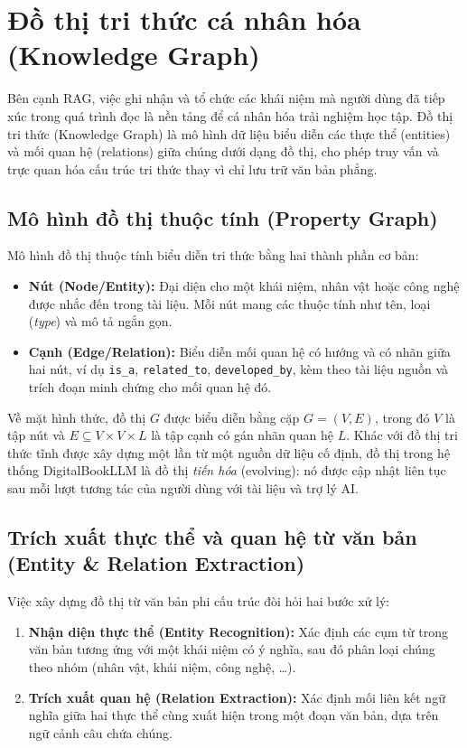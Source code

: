 \section{Đồ thị tri thức cá nhân hóa (Knowledge Graph)}

Bên cạnh RAG, việc ghi nhận và tổ chức các khái niệm mà người dùng đã tiếp xúc trong quá trình đọc là nền tảng để cá nhân hóa trải nghiệm học tập. Đồ thị tri thức (Knowledge Graph) là mô hình dữ liệu biểu diễn các thực thể (entities) và mối quan hệ (relations) giữa chúng dưới dạng đồ thị, cho phép truy vấn và trực quan hóa cấu trúc tri thức thay vì chỉ lưu trữ văn bản phẳng. \cite{lewis2020retrieval}

\subsection{Mô hình đồ thị thuộc tính (Property Graph)}
Mô hình đồ thị thuộc tính biểu diễn tri thức bằng hai thành phần cơ bản:

\begin{itemize}
    \item \textbf{Nút (Node/Entity):} Đại diện cho một khái niệm, nhân vật hoặc công nghệ được nhắc đến trong tài liệu. Mỗi nút mang các thuộc tính như tên, loại (\textit{type}) và mô tả ngắn gọn.
    \item \textbf{Cạnh (Edge/Relation):} Biểu diễn mối quan hệ có hướng và có nhãn giữa hai nút, ví dụ \texttt{is\_a}, \texttt{related\_to}, \texttt{developed\_by}, kèm theo tài liệu nguồn và trích đoạn minh chứng cho mối quan hệ đó.
\end{itemize}

Về mặt hình thức, đồ thị $G$ được biểu diễn bằng cặp $G = (V, E)$, trong đó $V$ là tập nút và $E \subseteq V \times V \times L$ là tập cạnh có gán nhãn quan hệ $L$. Khác với đồ thị tri thức tĩnh được xây dựng một lần từ một nguồn dữ liệu cố định, đồ thị trong hệ thống DigitalBookLLM là đồ thị \textit{tiến hóa} (evolving): nó được cập nhật liên tục sau mỗi lượt tương tác của người dùng với tài liệu và trợ lý AI.

\subsection{Trích xuất thực thể và quan hệ từ văn bản (Entity \& Relation Extraction)}
Việc xây dựng đồ thị từ văn bản phi cấu trúc đòi hỏi hai bước xử lý:

\begin{enumerate}
    \item \textbf{Nhận diện thực thể (Entity Recognition):} Xác định các cụm từ trong văn bản tương ứng với một khái niệm có ý nghĩa, sau đó phân loại chúng theo nhóm (nhân vật, khái niệm, công nghệ, \ldots).
    \item \textbf{Trích xuất quan hệ (Relation Extraction):} Xác định mối liên kết ngữ nghĩa giữa hai thực thể cùng xuất hiện trong một đoạn văn bản, dựa trên ngữ cảnh câu chứa chúng.
\end{enumerate}

